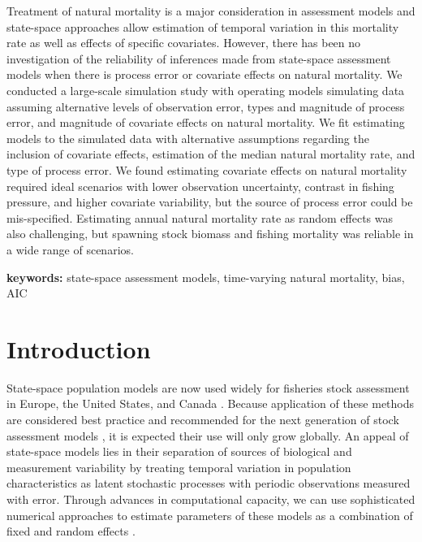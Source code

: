\documentclass[
  12pt,
]{article}
\begin{document}
Treatment of natural mortality is a major consideration in assessment
models and state-space approaches allow estimation of temporal variation
in this mortality rate as well as effects of specific covariates.
However, there has been no investigation of the reliability of
inferences made from state-space assessment models when there is process
error or covariate effects on natural mortality. We conducted a
large-scale simulation study with operating models simulating data
assuming alternative levels of observation error, types and magnitude of
process error, and magnitude of covariate effects on natural mortality.
We fit estimating models to the simulated data with alternative
assumptions regarding the inclusion of covariate effects, estimation of
the median natural mortality rate, and type of process error. We found
estimating covariate effects on natural mortality required ideal
scenarios with lower observation uncertainty, contrast in fishing
pressure, and higher covariate variability, but the source of process
error could be mis-specified. Estimating annual natural mortality rate
as random effects was also challenging, but spawning stock biomass and
fishing mortality was reliable in a wide range of scenarios.

\textbf{keywords:} state-space assessment models, time-varying natural
mortality, bias, AIC

\pagebreak

\section*{Introduction}\label{introduction}

State-space population models are now used widely for fisheries stock
assessment in Europe, the United States, and Canada
\citep{nielsenberg14, cadigan16, pedersenberg17, stockmiller21}. Because
application of these methods are considered best practice and
recommended for the next generation of stock assessment models
\citep{hoyleetal22, punt23}, it is expected their use will only grow
globally. An appeal of state-space models lies in their separation of
sources of biological and measurement variability by treating temporal
variation in population characteristics as latent stochastic processes
with periodic observations measured with error. Through advances in
computational capacity, we can use sophisticated numerical approaches to
estimate parameters of these models as a combination of fixed and random
effects \citep{thorsonminto15, kristensenetal16}.
\end{document}
